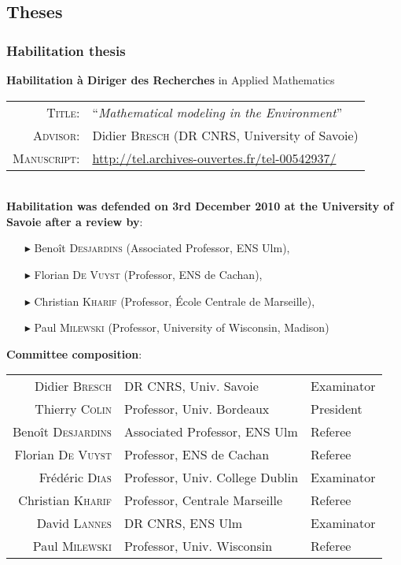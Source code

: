 \separator
\subsection{Theses}

\subsubsection{Habilitation thesis}
\textbf{Habilitation \`a Diriger des Recherches} in Applied Mathematics\\\vspace{1em}
\begin{tabular}{rl}
  \textsc{Title:} & ``\textit{Mathematical modeling in the Environment}'' \\
  \textsc{Advisor:} & Didier \textsc{Bresch} (DR CNRS, University of Savoie) \\
  \textsc{Manuscript:} & \url{http://tel.archives-ouvertes.fr/tel-00542937/}
\end{tabular}
\\\vspace{0.3cm}
\textbf{Habilitation was defended on 3rd December 2010 at the University of Savoie after a review by}:
\begin{itemize}
  \item[$\blacktriangleright$] Beno\^it \textsc{Desjardins} (Associated Professor, ENS Ulm),
  \item[$\blacktriangleright$] Florian \textsc{De Vuyst} (Professor, ENS de Cachan),
  \item[$\blacktriangleright$] Christian \textsc{Kharif} (Professor, \'Ecole Centrale de Marseille),
  \item[$\blacktriangleright$] Paul \textsc{Milewski} (Professor, University of Wisconsin, Madison)
\end{itemize}
\vspace{1em}
\textbf{Committee composition}:\\\vspace{1em}
\begin{tabular}{rll}
  Didier \textsc{Bresch} & DR CNRS, Univ. Savoie & Examinator \\
  Thierry \textsc{Colin} & Professor, Univ. Bordeaux & President \\
  Beno\^it \textsc{Desjardins} & Associated Professor, ENS Ulm & Referee \\
  Florian \textsc{De Vuyst} & Professor, ENS de Cachan & Referee \\
  Fr\'ed\'eric \textsc{Dias} & Professor, Univ. College Dublin & Examinator \\
  Christian \textsc{Kharif} & Professor, Centrale Marseille & Referee \\
  David \textsc{Lannes} & DR CNRS, ENS Ulm & Examinator \\
  Paul \textsc{Milewski} & Professor, Univ. Wisconsin & Referee \\
\end{tabular}
